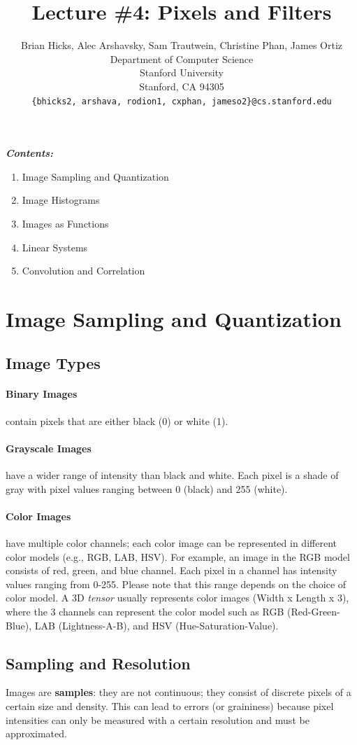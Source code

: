 \documentclass{article}
\title{Lecture \#4: Pixels and Filters}
\author{
  Brian Hicks, Alec Arshavsky, Sam Trautwein, Christine Phan, James Ortiz \\
  Department of Computer Science\\
  Stanford University\\
  Stanford, CA 94305 \\
  \texttt{\{bhicks2, arshava, rodion1, cxphan, jameso2\}@cs.stanford.edu} \\
}
\begin{document}
\maketitle


\emph{\textbf{Contents:}}
\begin{enumerate}
  \item Image Sampling and Quantization
  \item Image Histograms
  \item Images as Functions
  \item Linear Systems
  \item Convolution and Correlation
\end{enumerate}




\section{Image Sampling and Quantization}

\subsection{Image Types}
\paragraph{Binary Images}
        contain pixels that are either black (0) or white (1).
			\paragraph{Grayscale Images} have a wider range of intensity than black and white. Each pixel is a shade of gray with pixel values ranging between 0 (black) and 255 (white).
			\paragraph{Color Images} have multiple color channels; each color image can be represented in different color models (e.g., RGB, LAB, HSV). For example, an image in the RGB model consists of red, green, and blue channel. Each pixel in a channel has intensity values ranging from 0-255. Please note that this range depends on the choice of color model.
            A 3D \emph{tensor} usually represents color images (Width x Length x 3), where the 3 channels can represent the color model such as RGB (Red-Green-Blue), LAB (Lightness-A-B), and HSV (Hue-Saturation-Value).

		
	\subsection{Sampling and Resolution}
    Images are \textbf{samples}: they are not continuous; they consist of discrete pixels of a certain size and density. This can lead to errors (or graininess) because pixel intensities can only be measured with a certain resolution and must be approximated.
			
\end{document}
